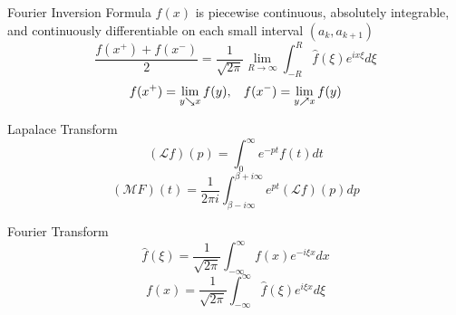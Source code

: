 \documentclass{beamer}
\begin{document}
\begin{frame}
\begin{block}{Fourier Inversion Formula}
$f(x)$ is piecewise continuous, absolutely integrable, and continuously differentiable on each small interval $(a_k,a_{k+1})$ 
$$\dfrac{f(x^+)+f(x^-)}{2}=\dfrac{1}{\sqrt{2\pi}}\lim\limits_{R\rightarrow\infty}\int_{-R}^R\widehat{f}(\xi)e^{ix\xi}d\xi$$
$$f(x^+)=\lim\limits_{y\searrow x}f(y),\hspace{3mm}f(x^-)=\lim\limits_{y\nearrow x}f(y)$$
\end{block}
\end{frame}
\begin{frame}
\begin{block}{Lapalace Transform}
$$(\mathscr{L} f)(p)=\int_0^{\infty}e^{-pt}f(t)dt$$
$$(\mathscr{M}F)(t) =\dfrac{1}{2\pi i}\int_{\beta-i\infty}^{\beta+i\infty}e^{pt}(\mathscr{L} f)(p) dp$$
\end{block}
\begin{block}{Fourier Transform}
$$\widehat{f}(\xi)=\dfrac{1}{\sqrt{2\pi}}\int_{-\infty}^{\infty}f(x)e^{-i\xi x}dx$$
$$f(x)=\dfrac{1}{\sqrt{2\pi}}\int_{-\infty}^{\infty}\widehat{f}(\xi)e^{i\xi x}d\xi$$
\end{block}
\end{frame}
\end{document}
